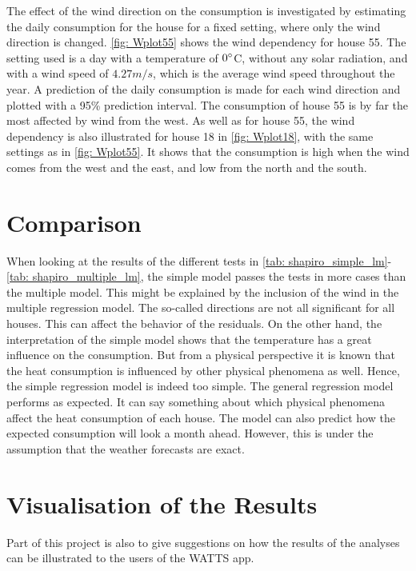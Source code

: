 \noindent The effect of the wind direction on the consumption is investigated by estimating the daily consumption for the house for a fixed setting, where only the wind direction is changed. \cref{fig: Wplot55} shows the wind dependency for house 55. The setting used is a day with a temperature of $0 \degree$C, without any solar radiation, and with a wind speed of $4.27 m/s$, which is the average wind speed throughout the year. A prediction of the daily consumption is made for each wind direction and plotted with a 95\% prediction interval.  The consumption of house 55 is by far the most affected by wind from the west. As well as for house 55, the wind dependency is also illustrated for house 18 in \cref{fig: Wplot18}, with the same settings as in \cref{fig: Wplot55}. It shows that the consumption is high when the wind comes from the west and the east, and low from the north and the south.

\section{Comparison}
When looking at the results of the different tests in \cref{tab: shapiro_simple_lm}-\ref{tab: shapiro_multiple_lm}, the simple model passes the tests in more cases than the multiple model. This might be explained by the inclusion of the wind in the multiple regression model. The so-called directions are not all significant for all houses. This can affect the behavior of the residuals. On the other hand, the interpretation of the simple model shows that the temperature has a great influence on the consumption. But from a physical perspective it is known that the heat consumption is influenced by other physical phenomena as well. Hence, the simple regression model is indeed too simple. The general regression model performs as expected. It can say something about which physical phenomena affect the heat consumption of each house. The model can also predict how the expected consumption will look a month ahead. However, this is under the assumption that the weather forecasts are exact. 

\section{Visualisation of the Results}
Part of this project is also to give suggestions on how the results of the analyses can be illustrated to the users of the WATTS app. \\

